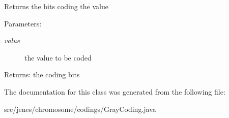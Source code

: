 Returns the bits coding the value

\begin{Desc}
\item[Parameters:]
\begin{description}
\item[{\em value}]the value to be coded \end{description}
\end{Desc}
\begin{Desc}
\item[Returns:]the coding bits \end{Desc}


The documentation for this class was generated from the following file:\begin{CompactItemize}
\item 
src/jenes/chromosome/codings/GrayCoding.java\end{CompactItemize}
